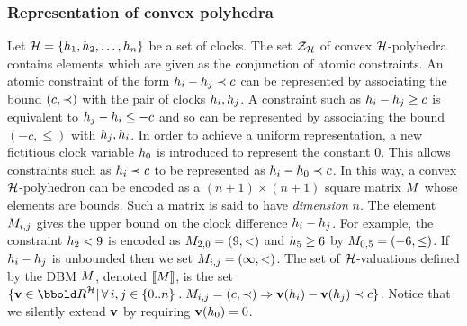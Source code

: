 {\subsubsection{Representation of convex polyhedra}
Let $\clocks = \{\clock_1,\clock_2,\ldots,\clock_n\}$ be a set of
clocks.  The set $\ClockZones$ of convex $\clocks$-polyhedra contains
elements which are given as the conjunction of atomic constraints.  An
atomic constraint of the form $h_i - h_j \prec c$ can be
represented by associating the bound $(c, \prec)$ with the pair of
clocks $h_i, h_j$. A constraint such as $h_i - h_j
\geq c$ is equivalent to $h_j - h_i \leq -c$ and so can be 
represented by associating the bound $(-c,\leq)$ with
$h_j,h_i$.  In order to achieve a uniform representation, a
new fictitious clock variable $h_0$ is introduced to represent
the constant $0$. This allows constraints such as $h_i \prec c$
to be represented as $h_i - h_0 \prec c$.  In this way, a
convex $\clocks$-polyhedron can be encoded as a $(n + 1)
\times (n + 1)$ square matrix ${M}$ whose elements are bounds. Such a matrix 
is said to have \emph{dimension} $n$. The element ${M}_{i,j}$ gives the
upper bound on the clock difference $h_i - h_j$. For
example, the constraint $h_2 < 9$ is encoded as ${M}_{2,0} =
(9,<)$ and $h_5 \geq 6$ by ${M}_{0,5} = (-6,\leq)$. If $h_i
-h_j$ is unbounded then we set ${M}_{i,j} = (\infty, <)$. The
set of $\clocks$-valuations defined by the DBM ${M}$, denoted
${\lbrack\!\lbrack}{M}{\rbrack\!\rbrack}$, is the set $\{\clkvl \in \clkvls | \forall i,j \in
\{0..n\} \such \M_{i,j} = (c,\brel) \implies \clkvl(\clock_i) -
\clkvl(\clock_j) \brel c\}$.  Notice that we silently extend $\mathbf{v}$
by requiring $\mathbf{v}(h_0) = 0$.

}
